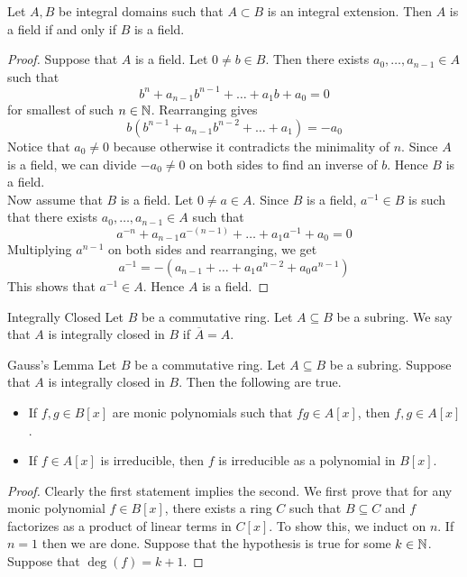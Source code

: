 \documentclass[a4paper]{article}
\begin{document}
\begin{lmm}{}{} Let $A,B$ be integral domains such that $A\subset B$ is an integral extension. Then $A$ is a field if and only if $B$ is a field. 
\begin{proof}
Suppose that $A$ is a field. Let $0\neq b\in B$. Then there exists $a_0,\dots,a_{n-1}\in A$ such that $$b^n+a_{n-1}b^{n-1}+\dots+a_1b+a_0=0$$ for smallest of such $n\in\mathbb{N}$. Rearranging gives $$b(b^{n-1}+a_{n-1}b^{n-2}+\dots+a_1)=-a_0$$ Notice that $a_0\neq 0$ because otherwise it contradicts the minimality of $n$. Since $A$ is a field, we can divide $-a_0\neq 0$ on both sides to find an inverse of $b$. Hence $B$ is a field. \\

Now assume that $B$ is a field. Let $0\neq a\in A$. Since $B$ is a field, $a^{-1}\in B$ is such that there exists $a_0,\dots,a_{n-1}\in A$ such that $$a^{-n}+a_{n-1}a^{-(n-1)}+\dots+a_1a^{-1}+a_0=0$$ Multiplying $a^{n-1}$ on both sides and rearranging, we get $$a^{-1}=-\left(a_{n-1}+\dots+a_1a^{n-2}+a_0a^{n-1}\right)$$ This shows that $a^{-1}\in A$. Hence $A$ is a field. 
\end{proof}
\end{lmm}

\begin{defn}{Integrally Closed}{} Let $B$ be a commutative ring. Let $A\subseteq B$ be a subring. We say that $A$ is integrally closed in $B$ if $\overline{A}=A$. 
\end{defn}

\begin{thm}{Gauss's Lemma}{} Let $B$ be a commutative ring. Let $A\subseteq B$ be a subring. Suppose that $A$ is integrally closed in $B$. Then the following are true. 
\begin{itemize}
\item If $f,g\in B[x]$ are monic polynomials such that $fg\in A[x]$, then $f,g\in A[x]$. 
\item If $f\in A[x]$ is irreducible, then $f$ is irreducible as a polynomial in $B[x]$. 
\end{itemize} 
\begin{proof}
Clearly the first statement implies the second. We first prove that for any monic polynomial $f\in B[x]$, there exists a ring $C$ such that $B\subseteq C$ and $f$ factorizes as a product of linear terms in $C[x]$. To show this, we induct on $n$. If $n=1$ then we are done. Suppose that the hypothesis is true for some $k\in\mathbb{N}$. Suppose that $\deg(f)=k+1$. 
\end{proof}
\end{thm}
\end{document}
